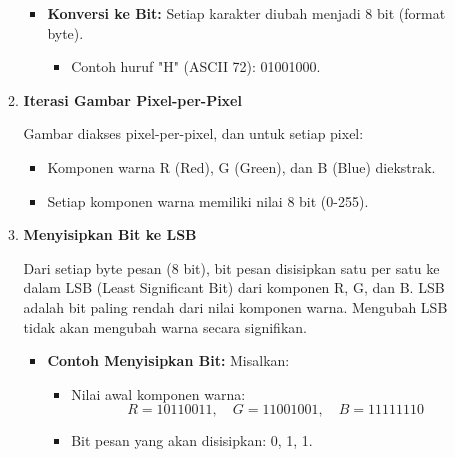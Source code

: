 \documentclass{ittelkom}
\begin{document}
\begin{enumerate}
\begin{enumerate}
\begin{itemize}
                        \item \textbf{Konversi ke Bit:}
                              Setiap karakter diubah menjadi 8 bit (format byte).
                              \begin{itemize}
                                  \item Contoh huruf "H" (ASCII 72): 01001000.
                              \end{itemize}
                    \end{itemize}

              \item \textbf{Iterasi Gambar Pixel-per-Pixel}

                    Gambar diakses pixel-per-pixel, dan untuk setiap pixel:
                    \begin{itemize}
                        \item Komponen warna R (Red), G (Green), dan B (Blue) diekstrak.
                        \item Setiap komponen warna memiliki nilai 8 bit (0-255).
                    \end{itemize}

              \item \textbf{Menyisipkan Bit ke LSB}

                    Dari setiap byte pesan (8 bit), bit pesan disisipkan satu per satu ke dalam LSB
                    (Least Significant Bit) dari komponen R, G, dan B. LSB adalah bit paling rendah
                    dari nilai komponen warna. Mengubah LSB tidak akan mengubah warna secara
                    signifikan.

                    \begin{itemize}
                        \item \textbf{Contoh Menyisipkan Bit:}
                              Misalkan:
                              \begin{itemize}
                                  \item Nilai awal komponen warna:
                                        \[
                                            R = 10110011, \quad G = 11001001, \quad B = 11111110
                                        \]
                                  \item Bit pesan yang akan disisipkan: 0, 1, 1.
                              \end{itemize}


\end{itemize}
\end{enumerate}
\end{enumerate}
\end{document}
